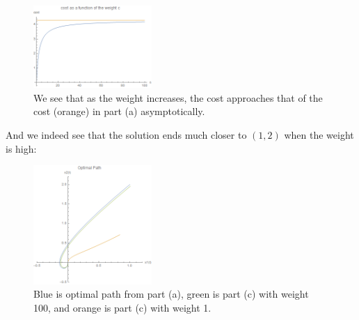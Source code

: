 \documentclass[12pt]{article}
\begin{document}
\begin{problem}[1]
\begin{enumerate}[label=(\alph*)]
~\begin{figure}[H]
	\centering
	\includegraphics[width=0.4\textwidth]{./figures/4.10.png}
	\caption{We see that as the weight increases, the cost approaches that of the cost (orange) in part (a) asymptotically.}
\end{figure}
And we indeed see that the solution ends much closer to $ (1,2)$ when the weight is high:
~\begin{figure}[H]
	\centering
	\includegraphics[width=0.4\textwidth]{./figures/4.11.png}
	\caption{Blue is optimal path from part (a), green is part (c) with weight 100, and orange is part (c) with weight 1.}
\end{figure}


\end{enumerate}
\end{problem}
\end{document}
